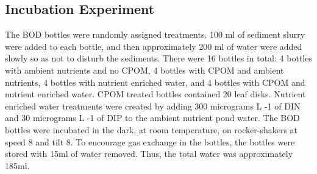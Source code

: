 \subsection{Incubation Experiment}

The BOD bottles were randomly assigned treatments. 100 ml of sediment slurry were added to each bottle, and then approximately 200 ml of water were added slowly so as not to disturb the sediments. There were 16 bottles in total: 4 bottles with ambient nutrients and no CPOM, 4 bottles with CPOM and ambient nutrients, 4 bottles with nutrient enriched water, and 4 bottles with CPOM and nutrient enriched water. CPOM treated bottles contained 20 leaf disks. Nutrient enriched water treatments were created by adding 300 micrograms L -1 of DIN and 30 micrograms L -1 of DIP to the ambient nutrient pond water. The BOD bottles were incubated in the dark, at room temperature, on rocker-shakers at speed 8 and tilt 8. To encourage gas exchange in the bottles, the bottles were stored with 15ml of water removed. Thus, the total water was approximately 185ml. 
    